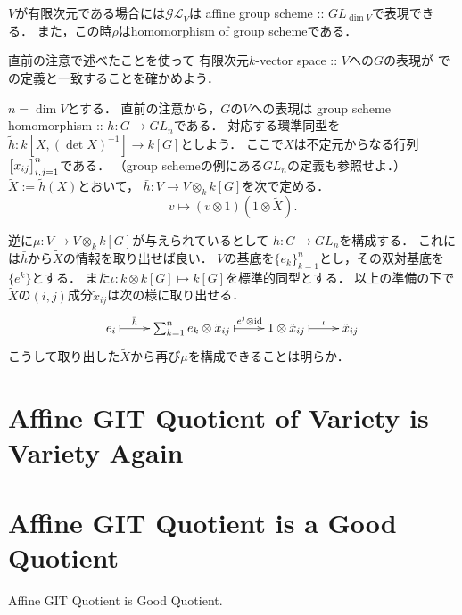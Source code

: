 \documentclass[a4paper]{jsarticle}
\newcommand{\ftorGL}{\mathcal{GL}}
\begin{document}
    \begin{Remark}
        $V$が有限次元である場合には$\ftorGL_V$は
        affine group scheme :: $GL_{\dim V}$で表現できる．
        また，この時$\rho$はhomomorphism of group schemeである．
    \end{Remark}
    \begin{Remark}
        直前の注意で述べたことを使って
        有限次元$k$-vector space :: $V$への$G$の表現が
        \cite{Muk1}での定義と一致することを確かめよう．
        
        $n=\dim V$とする．
        直前の注意から，$G$の$V$への表現は
        group scheme homomorphism :: $h: G \to GL_n$である．
        対応する環準同型を$\tilde{h}: k[X, (\det X)^{-1}] \to k[G]$としよう．
        ここで$X$は不定元からなる行列$\begin{bmatrix} x_{ij} \end{bmatrix}_{i,j=1}^n$である．
        （group schemeの例にある$GL_n$の定義も参照せよ．）
        $\tilde{X}:=\tilde{h}(X)$とおいて，
        $\bar{h}: V \to V \otimes_k k[G]$を次で定める．
        \[ v \mapsto (v \otimes 1)(1 \otimes \tilde{X}). \]
        
        逆に$\mu: V \to V \otimes_k k[G]$が与えられているとして
        $h: G \to GL_n$を構成する．
        これには$\bar{h}$から$\tilde{X}$の情報を取り出せば良い．
        $V$の基底を$\{ e_k \}_{k=1}^n$とし，その双対基底を$\{ e^k \}$とする．
        また$\iota: k \otimes k[G] \mapsto k[G]$を標準的同型とする．
        以上の準備の下で$\tilde{X}$の$(i,j)$成分$\tilde{x}_{ij}$は次の様に取り出せる．
        \[
        \xymatrix
        {
            e_i \ar@{|->}[r]^-{\bar{h}}& 
            \sum_{k=1}^n e_k \otimes \tilde{x}_{ij} \ar@{|->}[r]^-{e^j \otimes \id}&
            1 \otimes \tilde{x}_{ij} \ar@{|->}[r]^-{\iota} &
            \tilde{x}_{ij}
        }
        \]
        こうして取り出した$\tilde{X}$から再び$\mu$を構成できることは明らか．
    \end{Remark}

\section{Affine GIT Quotient of Variety is Variety Again }

\section{Affine GIT Quotient is a Good Quotient}
    \begin{Thm}\label{thm:git=good}
        Affine GIT Quotient is Good Quotient.
    \end{Thm}
\end{document}
